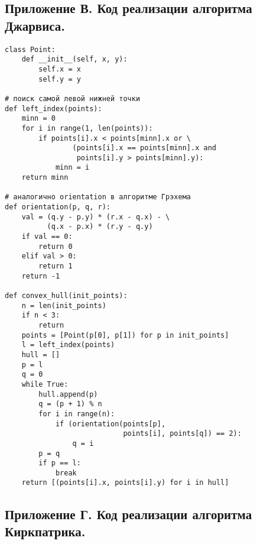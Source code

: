 \newpage

\subsection*{Приложение В. Код реализации алгоритма Джарвиса.}

\begin{verbatim}
class Point:
    def __init__(self, x, y):
        self.x = x
        self.y = y

# поиск самой левой нижней точки
def left_index(points):
    minn = 0
    for i in range(1, len(points)):
        if points[i].x < points[minn].x or \
                (points[i].x == points[minn].x and
                 points[i].y > points[minn].y):
            minn = i
    return minn

# аналогично orientation в алгоритме Грэхема
def orientation(p, q, r):
    val = (q.y - p.y) * (r.x - q.x) - \
          (q.x - p.x) * (r.y - q.y)
    if val == 0:
        return 0
    elif val > 0:
        return 1
    return -1

def convex_hull(init_points):
    n = len(init_points)
    if n < 3:
        return
    points = [Point(p[0], p[1]) for p in init_points]
    l = left_index(points)
    hull = []
    p = l
    q = 0
    while True:
        hull.append(p)
        q = (p + 1) % n
        for i in range(n):
            if (orientation(points[p],
                            points[i], points[q]) == 2):
                q = i
        p = q
        if p == l:
            break
    return [(points[i].x, points[i].y) for i in hull]
\end{verbatim}

\newpage

\subsection*{Приложение Г. Код реализации алгоритма Киркпатрика.}

